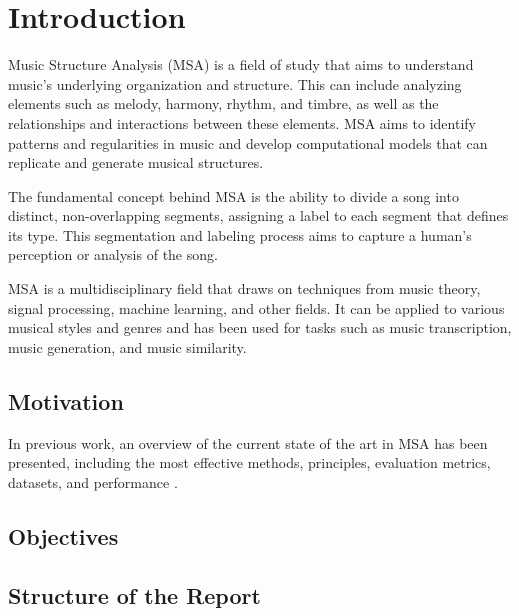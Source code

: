 \normallinespacing

\chapter{Introduction}

Music Structure Analysis (MSA) is a field of study that aims to understand music's underlying organization and structure. This can include analyzing elements such as melody, harmony, rhythm, and timbre, as well as the relationships and interactions between these elements. MSA aims to identify patterns and regularities in music and develop computational models that can replicate and generate musical structures.

The fundamental concept behind MSA is the ability to divide a song into distinct, non-overlapping segments, assigning a label to each segment that defines its type. This segmentation and labeling process aims to capture a human's perception or analysis of the song.

MSA is a multidisciplinary field that draws on techniques from music theory, signal processing, machine learning, and other fields. It can be applied to various musical styles and genres and has been used for tasks such as music transcription, music generation, and music similarity. 

\section{Motivation}

In previous work, an overview of the current state of the art in MSA has been presented, including the most effective methods, principles, evaluation metrics, datasets, and performance \cite{Nieto2020}.

\section{Objectives}

\section{Structure of the Report}


\newpage


